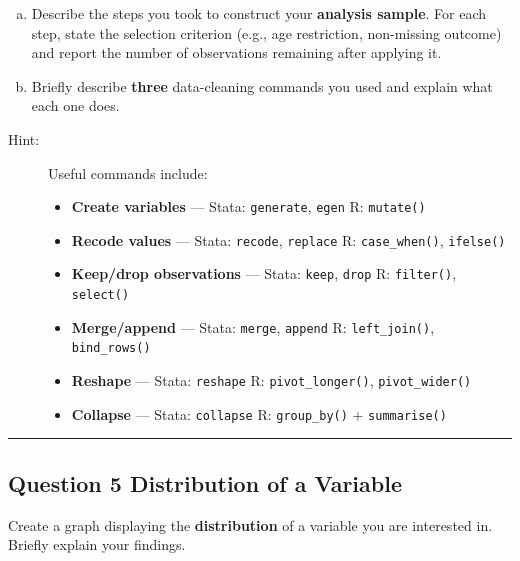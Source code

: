\documentclass[paper=a4, fontsize=11pt]{scrartcl}
\newcommand{\horrule}[1]{\rule{\linewidth}{#1}}
\begin{document}
\begin{enumerate}[(a)]
  \item Describe the steps you took to construct your \textbf{analysis sample}. For each step, state the selection criterion (e.g., age restriction, non-missing outcome) and report the number of observations remaining after applying it.
  \item Briefly describe \textbf{three} data-cleaning commands you used and explain what each one does.
\end{enumerate}

\begin{description}
  \item[Hint:] Useful commands include:
    \begin{itemize}
      \item \textbf{Create variables} --- Stata: \texttt{generate}, \texttt{egen} \quad R: \texttt{mutate()}
      \item \textbf{Recode values} --- Stata: \texttt{recode}, \texttt{replace} \quad R: \texttt{case\_when()}, \texttt{ifelse()}
      \item \textbf{Keep/drop observations} --- Stata: \texttt{keep}, \texttt{drop} \quad R: \texttt{filter()}, \texttt{select()}
      \item \textbf{Merge/append} --- Stata: \texttt{merge}, \texttt{append} \quad R: \texttt{left\_join()}, \texttt{bind\_rows()}
      \item \textbf{Reshape} --- Stata: \texttt{reshape} \quad R: \texttt{pivot\_longer()}, \texttt{pivot\_wider()}
      \item \textbf{Collapse} --- Stata: \texttt{collapse} \quad R: \texttt{group\_by()} + \texttt{summarise()}
    \end{itemize}
\end{description}

\bigskip\horrule{0.4pt}\bigskip


\subsection*{Question 5 \quad Distribution of a Variable}

Create a graph displaying the \textbf{distribution} of a variable you are interested in. Briefly explain your findings.
\end{document}
